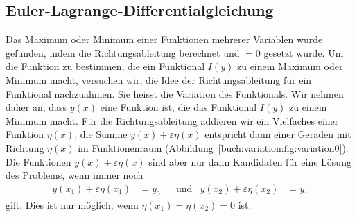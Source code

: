 %
%
%

%
%
\subsection{Euler-Lagrange-Differentialgleichung
\label{buch:variation:eulerlagrange:subsection:dgl}}

Das Maximum oder Minimum einer Funktionen mehrerer Variablen wurde
gefunden, indem die Richtungsableitung berechnet und $=0$ gesetzt
wurde.
Um die Funktion zu bestimmen, die ein Funktional $I(y)$ zu einem
Maximum oder Minimum macht, versuchen wir, die Idee der Richtungsableitung
für ein Funktional nachzuahmen.
Sie heisst die Variation des Funktionals.
Wir nehmen daher an, dass $y(x)$ eine Funktion ist, die das Funktional
$I(y)$ zu einem Minimum macht.
Für die Richtungsableitung addieren wir ein Vielfaches einer
Funktion $\eta(x)$, die Summe $y(x)+\varepsilon\eta(x)$ entspricht
dann einer Geraden mit Richtung $\eta(x)$ im Funktionenraum
(Abbildung~\ref{buch:variation:fig:variation0}).
Die Funktionen $y(x)+\varepsilon\eta(x)$ sind aber nur dann Kandidaten
für eine Lösung des Problems, wenn immer noch
\begin{align*}
y(x_1) + \varepsilon \eta(x_1) &= y_0
&&\text{und}&
y(x_2) + \varepsilon \eta(x_2) &= y_1
\end{align*}
gilt.
Dies ist nur möglich, wenn $\eta(x_1)=\eta(x_2)=0$ ist.

%
%
